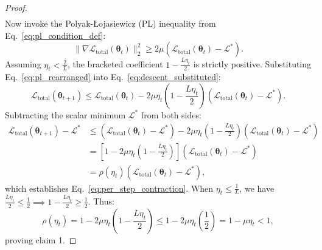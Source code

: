 \begin{proof}
\begin{align}
\label{eq:descent_substituted}
\end{align}
Now invoke the Polyak-\L{}ojasiewicz (PL) inequality from Eq.~\eqref{eq:pl_condition_def}:
\begin{equation}
\|\nabla \mathcal{L}_{\text{total}}(\bm{\theta}_t)\|_2^2 \ge 2\mu \left( \mathcal{L}_{\text{total}}(\bm{\theta}_t) - \mathcal{L}^* \right).
\label{eq:pl_rearranged}
\end{equation}
Assuming $\eta_t < \frac{2}{L}$, the bracketed coefficient $1 - \frac{L \eta_t}{2}$ is strictly positive.
Substituting Eq.~\eqref{eq:pl_rearranged} into Eq.~\eqref{eq:descent_substituted}:
\begin{equation}
\mathcal{L}_{\text{total}}(\bm{\theta}_{t+1}) \le \mathcal{L}_{\text{total}}(\bm{\theta}_t) - 2\mu \eta_t \left( 1 - \frac{L \eta_t}{2} \right) \left( \mathcal{L}_{\text{total}}(\bm{\theta}_t) - \mathcal{L}^* \right).
\end{equation}
Subtracting the scalar minimum $\mathcal{L}^*$ from both sides:
\begin{align}
\mathcal{L}_{\text{total}}(\bm{\theta}_{t+1}) - \mathcal{L}^* &\le \left( \mathcal{L}_{\text{total}}(\bm{\theta}_t) - \mathcal{L}^* \right) - 2\mu \eta_t \left( 1 - \frac{L \eta_t}{2} \right) \left( \mathcal{L}_{\text{total}}(\bm{\theta}_t) - \mathcal{L}^* \right) \nonumber \\
&= \left[ 1 - 2\mu \eta_t \left( 1 - \frac{L \eta_t}{2} \right) \right] \left( \mathcal{L}_{\text{total}}(\bm{\theta}_t) - \mathcal{L}^* \right) \nonumber \\
&= \rho(\eta_t) \left( \mathcal{L}_{\text{total}}(\bm{\theta}_t) - \mathcal{L}^* \right),
\end{align}
which establishes Eq.~\eqref{eq:per_step_contraction}.
When $\eta_t \le \frac{1}{L}$, we have $\frac{L \eta_t}{2} \le \frac{1}{2} \implies 1 - \frac{L \eta_t}{2} \ge \frac{1}{2}$. Thus:
\begin{equation}
\rho(\eta_t) = 1 - 2\mu \eta_t \left(1 - \frac{L\eta_t}{2}\right) \le 1 - 2\mu \eta_t \left(\frac{1}{2}\right) = 1 - \mu \eta_t < 1,
\end{equation}
proving claim 1.


\end{proof}
